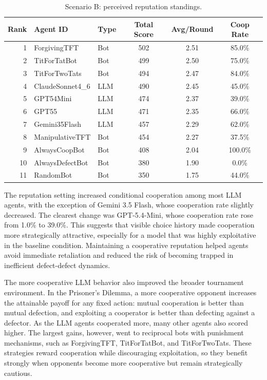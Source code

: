 \documentclass[11pt]{article}
\begin{document}
\begin{table}[H]
\centering
\caption{Scenario B: perceived reputation standings.}
\small
\begin{tabular}{rllccc}
\toprule
Rank & Agent ID & Type & Total Score & Avg/Round & Coop Rate \\
\midrule
1 & ForgivingTFT & Bot & 502 & 2.51 & 85.0\% \\
2 & TitForTatBot & Bot & 499 & 2.50 & 75.0\% \\
3 & TitForTwoTats & Bot & 494 & 2.47 & 84.0\% \\
4 & ClaudeSonnet4\_6 & LLM & 490 & 2.45 & 45.0\% \\
5 & GPT54Mini & LLM & 474 & 2.37 & 39.0\% \\
6 & GPT55 & LLM & 471 & 2.35 & 66.0\% \\
7 & Gemini35Flash & LLM & 457 & 2.29 & 62.0\% \\
8 & ManipulativeTFT & Bot & 454 & 2.27 & 37.5\% \\
9 & AlwaysCoopBot & Bot & 408 & 2.04 & 100.0\% \\
10 & AlwaysDefectBot & Bot & 380 & 1.90 & 0.0\% \\
11 & RandomBot & Bot & 350 & 1.75 & 44.0\% \\
\bottomrule
\end{tabular}
\end{table}

The reputation setting increased conditional cooperation among most LLM agents, with the exception of Gemini 3.5 Flash, whose cooperation rate slightly decreased. The clearest change was GPT-5.4-Mini, whose cooperation rate rose from 1.0\% to 39.0\%. This suggests that visible choice history made cooperation more strategically attractive, especially for a model that was highly exploitative in the baseline condition. Maintaining a cooperative reputation helped agents avoid immediate retaliation and reduced the risk of becoming trapped in inefficient defect-defect dynamics.

The more cooperative LLM behavior also improved the broader tournament environment. In the Prisoner's Dilemma, a more cooperative opponent increases the attainable payoff for any fixed action: mutual cooperation is better than mutual defection, and exploiting a cooperator is better than defecting against a defector. As the LLM agents cooperated more, many other agents also scored higher. The largest gains, however, went to reciprocal bots with punishment mechanisms, such as ForgivingTFT, TitForTatBot, and TitForTwoTats. These strategies reward cooperation while discouraging exploitation, so they benefit strongly when opponents become more cooperative but remain strategically cautious.
\end{document}
